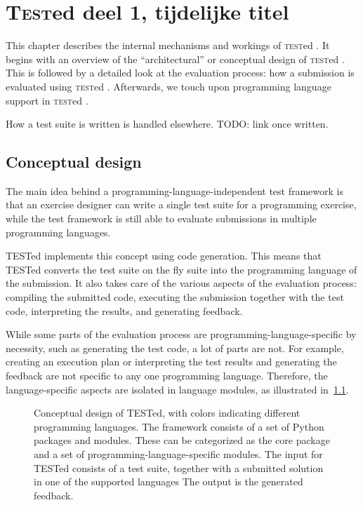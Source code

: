 \documentclass[../main]{subfiles}
\begin{document}
\newcommand{\tested}{\textsc{test}ed }
\newcommand{\Tested}{\textsc{Test}ed }

\chapter{\Tested{} deel 1, tijdelijke titel}
\label{ch:tested-deel-1-tijdelijke-titel}

This chapter describes the internal mechanisms and workings of \tested{}.
It begins with an overview of the ``architectural'' or conceptual design of \tested{}.
This is followed by a detailed look at the evaluation process: how a submission is evaluated using \tested{}.
Afterwards, we touch upon programming language support in \tested{}.

How a test suite is written is handled elsewhere.
TODO: link once written.

\section{Conceptual design}
\label{sec:conceptual design}

The main idea behind a programming-language-independent test framework is that an exercise designer can write a single test suite for a programming exercise, while the test framework is still able to evaluate submissions in multiple programming languages.

TESTed implements this concept using code generation.
This means that TESTed converts the test suite on the fly suite into the programming language of the submission.
It also takes care of the various aspects of the evaluation process: compiling the submitted code, executing the submission together with the test code, interpreting the results, and generating feedback.

While some parts of the evaluation process are programming-language-specific by necessity, such as generating the test code, a lot of parts are not.
For example, creating an execution plan or interpreting the test results and generating the feedback are not specific to any one programming language.
Therefore, the language-specific aspects are isolated in language modules, as illustrated in~\cref{fig:conceptual-design}.

\begin{figure}[t]
    \centering
    
    \caption{
        Conceptual design of TESTed, with colors indicating different programming languages.
        The framework consists of a set of Python packages and modules.
        These can be categorized as the core package and a set of programming-language-specific modules.
        The input for TESTed consists of a test suite, together with a submitted solution in one of the supported languages
        The output is the generated feedback.
    }
    \label{fig:conceptual-design}
\end{figure}
\end{document}
